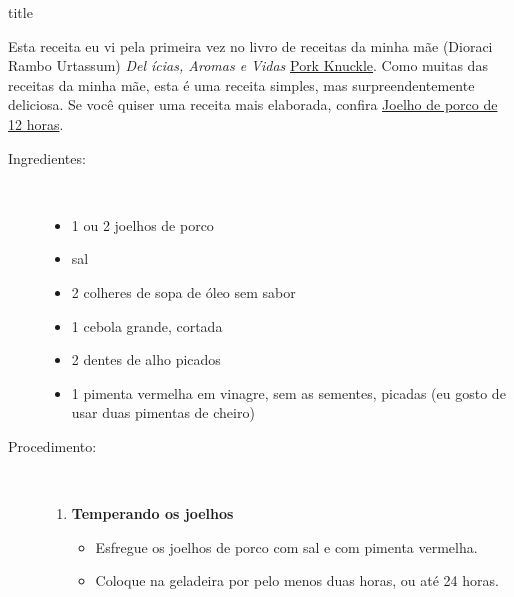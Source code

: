 \documentclass [11pt, letterpaper] {article}
\begin{document}
 {title}

Esta receita eu vi pela primeira vez no livro de receitas da minha mãe (Dioraci Rambo Urtassum) {\it Del \'icias, Aromas e Vidas} \href {PorkKnuckle.html} {Pork Knuckle}. Como muitas das receitas da minha mãe, esta é uma receita simples, mas surpreendentemente deliciosa. Se você quiser uma receita mais elaborada, confira \href {TwelveHourPorkShank.html} {Joelho de porco de 12 horas}.



\begin {description}

\item [Ingredientes:] \ \\
\begin {itemize}
\item 1 ou 2 joelhos de porco
\item sal
\item 2 colheres de sopa de óleo sem sabor
\item 1 cebola grande, cortada
\item 2 dentes de alho picados
\item 1 pimenta vermelha em vinagre, sem as sementes, picadas (eu gosto de usar duas pimentas de cheiro)
\end {itemize}

\item [Procedimento:] \ \\

\begin {enumerate}
\item {\bf Temperando os joelhos}
\begin {itemize}
\item Esfregue os joelhos de porco com sal e com pimenta vermelha.
\item Coloque na geladeira por pelo menos duas horas, ou até 24 horas.
\end {itemize}


\end{enumerate}
\end{description}
\end{document}
